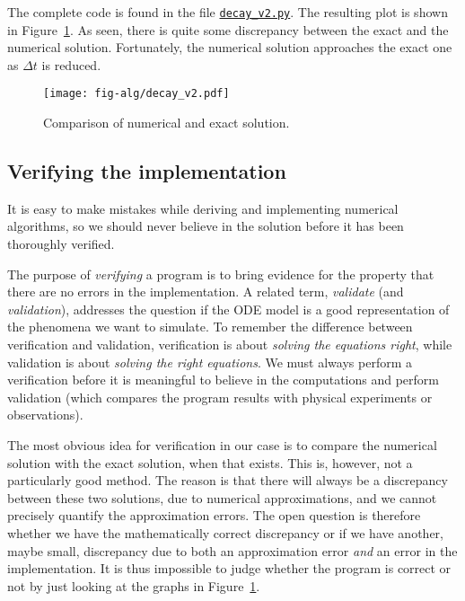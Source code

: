 \documentclass[graybox,sectrefs,envcountresetchap,open=right,final]{svmonodo}
\newenvironment{notice_mdfboxadmon}[1][]{
\begin{notice_mdfboxmdframed}[frametitle=#1]
}
{
\end{notice_mdfboxmdframed}
}
\begin{document}
The complete code is found in the file
\href{{http://tinyurl.com/ofkw6kc/alg/decay_v2.py}}{\nolinkurl{decay_v2.py}}. The resulting plot
is shown in Figure~\ref{decay:fig:v2}. As seen, there is quite some
discrepancy between the exact and the numerical solution.
Fortunately, the numerical solution approaches the exact one as
$\Delta t$ is reduced.


\begin{figure}[!ht]  %
  \centerline{\texttt{[image: fig-alg/decay\_v2.pdf]}}
  \caption{
  Comparison of numerical and exact solution. \label{decay:fig:v2}
  }
\end{figure}



\subsection{Verifying the implementation}

It is easy to make mistakes while deriving and implementing numerical
algorithms, so we should never believe in the solution before it has
been thoroughly verified.


\begin{notice_mdfboxadmon}
The purpose of \emph{verifying} a program is to bring evidence for the
property that there are no errors in the implementation. A related
term, \emph{validate} (and \emph{validation}),
addresses the question if the ODE model is a good
representation of the phenomena we want to simulate. To remember the
difference between verification and validation, verification is
about \emph{solving the equations right}, while validation is about \emph{solving
the right equations}. We must always perform a verification before
it is meaningful to believe in the computations and perform validation
(which compares the program results with physical experiments or observations).
\end{notice_mdfboxadmon}




The most obvious idea for verification
in our case is to compare the numerical solution with the exact
solution, when that exists. This is, however, not a particularly good
method. The reason is that there will always
be a discrepancy
between these two solutions, due to numerical
approximations, and we cannot precisely quantify the approximation
errors. The open question is therefore whether we have the
mathematically correct
discrepancy or if we have another, maybe small,
discrepancy due to both an approximation error \emph{and} an error in the
implementation. It is thus
impossible to judge whether the program is correct or not by
just looking at the graphs in Figure~\ref{decay:fig:v2}.
\end{document}
